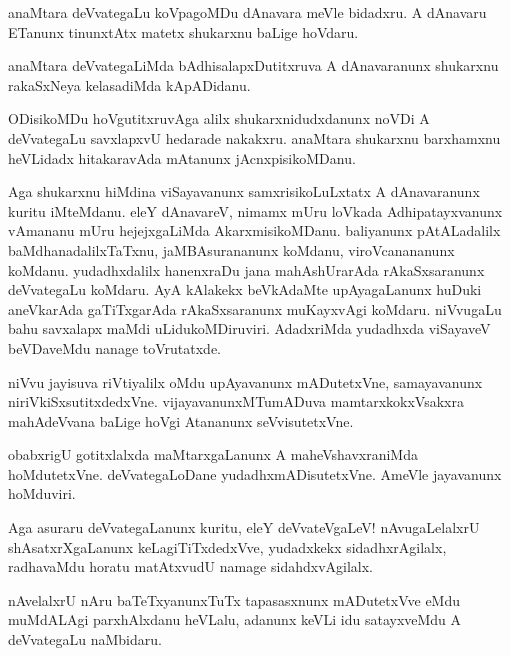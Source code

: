 \documentclass{article}
\begin{document}
\begin{mn}%
anaMtara deVvategaLu koVpagoMDu dAnavara meVle bidadxru. A dAnavaru
ETanunx tinunxtAtx matetx shukarxnu baLige hoVdaru.
\end{mn}

\begin{mn}
anaMtara deVvategaLiMda bAdhisalapxDutitxruva A dAnavaranunx shukarxnu
rakaSxNeya kelasadiMda kApADidanu.
\end{mn}

\begin{mn}
ODisikoMDu hoVgutitxruvAga alilx shukarxnidudxdanunx noVDi A
deVvategaLu savxlapxvU hedarade nakakxru. anaMtara shukarxnu
barxhamxnu heVLidadx hitakaravAda mAtanunx jAcnxpisikoMDanu.
\end{mn}

\begin{mn}%
Aga shukarxnu hiMdina viSayavanunx samxrisikoLuLxtatx A dAnavaranunx
kuritu iMteMdanu. eleY dAnavareV, nimamx mUru loVkada Adhipatayxvanunx
vAmananu mUru hejejxgaLiMda AkarxmisikoMDanu. baliyanunx pAtALadalilx
baMdhanadalilxTaTxnu, jaMBAsurananunx koMdanu, viroVcanananunx
koMdanu. yudadhxdalilx hanenxraDu jana mahAshUrarAda rAkaSxsaranunx
deVvategaLu koMdaru. AyA kAlakekx beVkAdaMte upAyagaLanunx huDuki
aneVkarAda gaTiTxgarAda rAkaSxsaranunx muKayxvAgi koMdaru. niVvugaLu
bahu savxalapx maMdi uLidukoMDiruviri. AdadxriMda yudadhxda viSayaveV
beVDaveMdu nanage toVrutatxde.
\end{mn}

\begin{mn}
niVvu jayisuva riVtiyalilx oMdu upAyavanunx mADutetxVne, samayavanunx
niriVkiSxsutitxdedxVne. vijayavanunxMTumADuva mamtarxkokxVsakxra
mahAdeVvana baLige hoVgi Atananunx seVvisutetxVne.
\end{mn}

\begin{mn}
obabxrigU gotitxlalxda maMtarxgaLanunx A maheVshavxraniMda
hoMdutetxVne. deVvategaLoDane yudadhxmADisutetxVne. AmeVle jayavanunx hoMduviri.
\end{mn}

\begin{mn}
Aga asuraru deVvategaLanunx kuritu, eleY deVvateVgaLeV! nAvugaLelalxrU
shAsatxrXgaLanunx keLagiTiTxdedxVve, yudadxkekx sidadhxrAgilalx,
radhavaMdu horatu matAtxvudU namage sidahdxvAgilalx.
\end{mn}

\begin{mn}
nAvelalxrU nAru baTeTxyanunxTuTx tapasasxnunx mADutetxVve eMdu
muMdALAgi parxhAlxdanu heVLalu, adanunx keVLi idu satayxveMdu A
deVvategaLu naMbidaru.
\end{mn}
\end{document}
